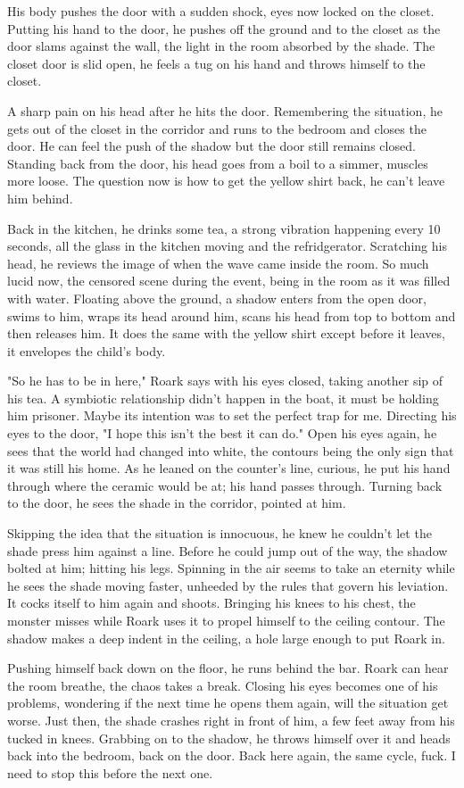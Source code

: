         His body pushes the door with a sudden shock, eyes now locked on the closet. Putting his hand to the door, he pushes off the ground and
    to the closet as the door slams against the wall, the light in the room absorbed by the shade. The closet door is slid open, he feels a tug
    on his hand and throws himself to the closet.

        A sharp pain on his head after he hits the door. Remembering the situation, he gets out of the closet in the corridor and runs to the 
    bedroom and closes the door. He can feel the push of the shadow but the door still remains closed. Standing back from the door, his head
    goes from a boil to a simmer, muscles more loose. The question now is how to get the yellow shirt back, he can't leave him behind.

        Back in the kitchen, he drinks some tea, a strong vibration happening every 10 seconds, all the glass in the kitchen moving and the 
    refridgerator. Scratching his head, he reviews the image of when the wave came inside the room. So much lucid now, the censored scene during
    the event, being in the room as it was filled with water. Floating above the ground, a shadow enters from the open door, swims to him,
    wraps its head around him, scans his head from top to bottom and then releases him. It does the same with the yellow shirt except before it
    leaves, it envelopes the child's body.

        "So he has to be in here," Roark says with his eyes closed, taking another sip of his tea. A symbiotic relationship didn't happen in
    the boat, it must be holding him prisoner. Maybe its intention was to set the perfect trap for me. Directing his eyes to the door, "I hope
    this isn't the best it can do." Open his eyes again, he sees that the world had changed into white, the contours being the only sign that
    it was still his home. As he leaned on the counter's line, curious, he put his hand through where the ceramic would be at; his hand passes
    through. Turning back to the door, he sees the shade in the corridor, pointed at him.

        Skipping the idea that the situation is innocuous, he knew he couldn't let the shade press him against a line. Before he could jump
    out of the way, the shadow bolted at him; hitting his legs. Spinning in the air seems to take an eternity while he sees the shade moving
    faster, unheeded by the rules that govern his leviation. It cocks itself to him again and shoots. Bringing his knees to his chest, the 
    monster misses while Roark uses it to propel himself to the ceiling contour. The shadow makes a deep indent in the ceiling, a hole large
    enough to put Roark in.

        Pushing himself back down on the floor, he runs behind the bar. Roark can hear the room breathe, the chaos takes a break. Closing his
    eyes becomes one of his problems, wondering if the next time he opens them again, will the situation get worse. Just then, the shade crashes
    right in front of him, a few feet away from his tucked in knees. Grabbing on to the shadow, he throws himself over it and heads back into
    the bedroom, back on the door. Back here again, the same cycle, fuck. I need to stop this before the next one.
